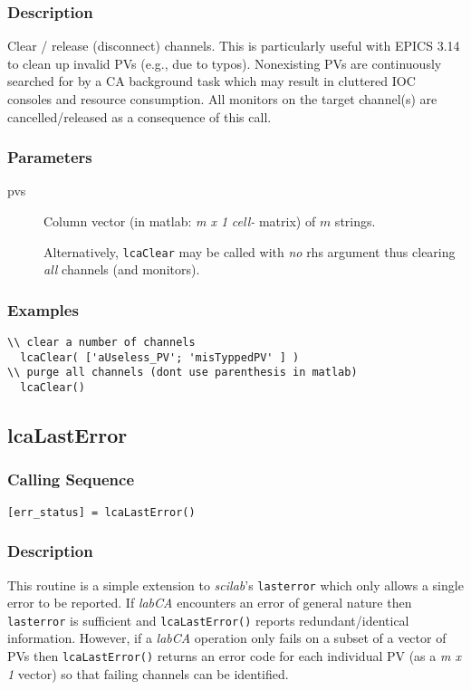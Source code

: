 \documentclass{article}
\newcommand{\sca}{\ita{labCA}}
\newcommand{\scilab}{\ita{scilab}}
\newcommand{\com}[1]{{\tt #1}}
\newcommand{\pbrkf}{\pagebreak}
\newcommand{\ita}[1]{\emph{#1}}
\newcommand{\m}{$m$}
\newcommand{\mhack}{$m$} %
\newcommand{\mxl}{$m\times 1$}
\renewcommand{\m}{\ita{m}}
\newcommand{\mhack}{\ita{m}} %
\renewcommand{\mxl}{\ita{m x 1}}
\renewcommand{\pbrkf}{}
\newcommand{\PVITEM}{
\item[pvs] Column vector (in matlab: \mxl{} \ita{cell-} matrix)
of \mhack{} strings.
}
\begin{document}
\subsubsection{Description}
Clear / release (disconnect) channels. This is particularly useful with
EPICS 3.14 to clean up invalid PVs (e.g., due to typos). Nonexisting PVs are
continuously searched for by a CA background task which may result
in cluttered IOC consoles and resource consumption.
All monitors on the target channel(s) are cancelled/released as a
consequence of this call.
\subsubsection{Parameters}
\begin{description}
\PVITEM
Alternatively, \com{lcaClear} may be called with {\em no} rhs argument
thus clearing {\em all} channels (and monitors).
\end{description}
\subsubsection{Examples}
\begin{verbatim}
\\ clear a number of channels
  lcaClear( ['aUseless_PV'; 'misTyppedPV' ] )
\\ purge all channels (dont use parenthesis in matlab)
  lcaClear()
\end{verbatim}

\vspace*{\fill}
\pbrkf
\subsection{lcaLastError}
\label{lcalasterror}
\subsubsection{Calling Sequence}
\begin{verbatim}
[err_status] = lcaLastError()
\end{verbatim}
\subsubsection{Description}
This routine is a simple extension to \scilab{}'s \com{lasterror}
which only allows a single error to be reported. If \sca{} encounters
an error of general nature then \com{lasterror} is sufficient
and \com{lcaLastError()} reports redundant/identical information.
However, if a \sca{} operation only fails on a subset of a vector
of PVs then \com{lcaLastError()} returns an error code for each individual
PV (as a \mxl{} vector) so that failing channels can be identified.
\end{document}
